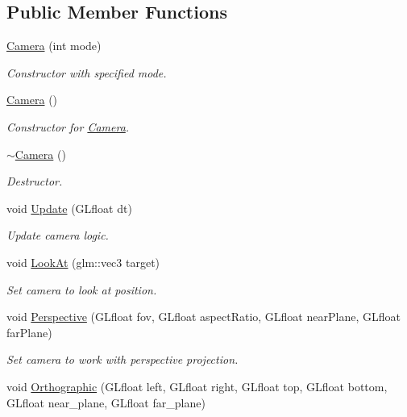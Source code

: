 \subsection*{Public Member Functions}
\begin{DoxyCompactItemize}
\item 
\mbox{\hyperlink{class_camera_a706e41a11eee92cd3f597386ae860885}{Camera}} (int mode)
\begin{DoxyCompactList}\small\item\em Constructor with specified mode. \end{DoxyCompactList}\item 
\mbox{\hyperlink{class_camera_a01f94c3543f56ede7af49dc778f19331}{Camera}} ()
\begin{DoxyCompactList}\small\item\em Constructor for \mbox{\hyperlink{class_camera}{Camera}}. \end{DoxyCompactList}\item 
\mbox{\hyperlink{class_camera_ad1897942d0ccf91052386388a497349f}{$\sim$\+Camera}} ()
\begin{DoxyCompactList}\small\item\em Destructor. \end{DoxyCompactList}\item 
void \mbox{\hyperlink{class_camera_ac8e78ac212afde90f72d59b3795474d0}{Update}} (G\+Lfloat dt)
\begin{DoxyCompactList}\small\item\em Update camera logic. \end{DoxyCompactList}\item 
void \mbox{\hyperlink{class_camera_a657181de0da2b330865d005a3e08cc9f}{Look\+At}} (glm\+::vec3 target)
\begin{DoxyCompactList}\small\item\em Set camera to look at position. \end{DoxyCompactList}\item 
void \mbox{\hyperlink{class_camera_a61d3c3da4bab7c69c7f24c3f37abe1e5}{Perspective}} (G\+Lfloat fov, G\+Lfloat aspect\+Ratio, G\+Lfloat near\+Plane, G\+Lfloat far\+Plane)
\begin{DoxyCompactList}\small\item\em Set camera to work with perspective projection. \end{DoxyCompactList}\item 
void \mbox{\hyperlink{class_camera_ad434a557e137d9c24369a3737f857736}{Orthographic}} (G\+Lfloat left, G\+Lfloat right, G\+Lfloat top, G\+Lfloat bottom, G\+Lfloat near\+\_\+plane, G\+Lfloat far\+\_\+plane)

\end{DoxyCompactItemize}
